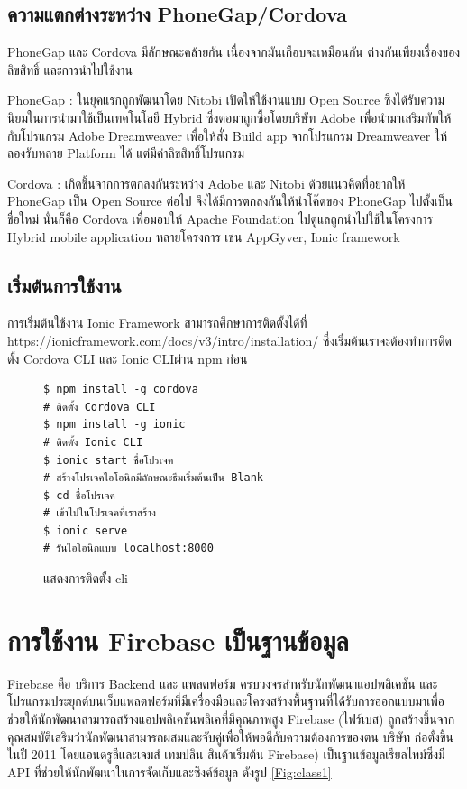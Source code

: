 		\subsection{ความแตกต่างระหว่าง PhoneGap/Cordova}
		PhoneGap และ Cordova มีลักษณะคล้ายกัน เนื่องจากมันเกือบจะเหมือนกัน ต่างกันเพียงเรื่องของลิขสิทธิ์ และการนำไปใช้งาน
		\item PhoneGap : ในยุคแรกถูกพัฒนาโดย Nitobi เปิดให้ใช้งานแบบ Open Source ซึ่งได้รับความนิยมในการนำมาใช้เป็นเทคโนโลยี Hybrid ซึ่งต่อมาถูกซื้อโดยบริษัท Adobe เพื่อนำมาเสริมทัพให้กับโปรแกรม Adobe Dreamweaver เพื่อให้สั่ง Build app จากโปรแกรม Dreamweaver ให้ลองรับหลาย Platform ได้ แต่มีค่าลิขสิทธิ์โปรแกรม
		\item Cordova : เกิดขึ้นจากการตกลงกันระหว่าง Adobe และ Nitobi ด้วยแนวคิดที่อยากให้ PhoneGap เป็น Open Source ต่อไป จึงได้มีการตกลงกันให้นำโค๊ดของ PhoneGap ไปตั้งเป็นชื่อใหม่ นั่นก็คือ Cordova เพื่อมอบให้ Apache Foundation ไปดูแลถูกนำไปใช้ในโครงการ Hybrid mobile application หลายโครงการ เช่น AppGyver, Ionic framework
		 
		\subsection{เริ่มต้นการใช้งาน}
		การเริ่มต้นใช้งาน Ionic Framework สามารถศึกษาการติดตั้งได้ที่ https://ionicframework.com/docs/v3/intro/installation/ ซี่งเริ่มต้นเราจะต้องทำการติดตั้ง Cordova CLI และ Ionic CLIผ่าน npm ก่อน
		\begin{figure}[H]
			{\begin{lstlisting}
$ npm install -g cordova 
# ติดตั้ง Cordova CLI
$ npm install -g ionic 
# ติดตั้ง Ionic CLI
$ ionic start ชื่อโปรเจค
# สร้างโปรเจคไอโอนิกมีลักษณะธีมเริ่มต้นเป็น Blank
$ cd ชื่อโปรเจค
# เข้าไปในโปรเจคที่เราสร้าง
$ ionic serve
# รันไอโอนิกแบบ localhost:8000
				\end{lstlisting}}
			\centering
			\caption{แสดงการติดตั้ง cli}
			\label{Fig:vue_cdn}
		\end{figure}
		


	\section{การใช้งาน Firebase เป็นฐานข้อมูล}
	Firebase \cite{bib9} คือ บริการ Backend และ แพลตฟอร์ม ครบวงจรสำหรับนักพัฒนาแอปพลิเคชัน และโปรแกรมประยุกต์บนเว็บแพลตฟอร์มที่มีเครื่องมือและโครงสร้างพื้นฐานที่ได้รับการออกแบบมาเพื่อช่วยให้นักพัฒนาสามารถสร้างแอปพลิเคชันพลิเคที่มีคุณภาพสูง Firebase (ไฟร์เบส) ถูกสร้างขึ้นจากคุณสมบัติเสริมว่านักพัฒนาสามารถผสมและจับคู่เพื่อให้พอดีกับความต้องการของตน บริษัท ก่อตั้งขึ้นในปี 2011 โดยแอนดรูลีและเจมส์ เทมปลิน สินค้าเริ่มต้น Firebase) เป็นฐานข้อมูลเรียลไทม์ซึ่งมี API ที่ช่วยให้นักพัฒนาในการจัดเก็บและซิงค์ข้อมูล ดังรูป \ref{Fig:class1}
	
